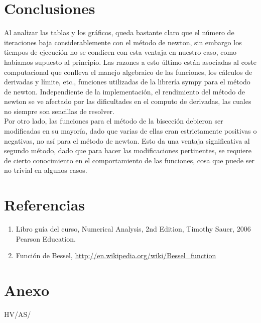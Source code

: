 \documentclass[spanish, fleqn]{article}
\begin{document}
\section{Conclusiones}
	Al analizar las tablas y los gráficos, queda bastante claro que el número 
	de iteraciones baja considerablemente con el método de newton, sin embargo
	los tiempos de ejecución no se condicen con esta ventaja en nuestro caso,
	como habíamos supuesto al principio. Las razones a esto último están
	asociadas al coste computacional que conlleva el manejo algebraico de las
	funciones, los cálculos de derivadas y límite, etc., funciones utilizadas
	de la librería sympy para el método de newton. Independiente de la 
	implementación, el rendimiento del método de newton se ve afectado por las
	dificultades en el computo de derivadas, las cuales no siempre son
	sencillas de resolver.\\
	Por otro lado, las funciones para el método de la bisección debieron ser
	modificadas en su mayoría, dado que varias de ellas eran estrictamente
	positivas o negativas, no así para el método de newton. Esto da una ventaja
	significativa al segundo método, dado que para hacer las modificaciones
	pertinentes, se requiere de cierto conocimiento en el comportamiento de las
	funciones, cosa que puede ser no trivial en algunos casos.   

\section{Referencias}
\begin{enumerate}
	\item
		Libro guía del curso, Numerical Analysis, 2nd Edition, Timothy Sauer,
		2006 Pearson Education.
	\item
		Función de Bessel, \url{http://en.wikipedia.org/wiki/Bessel_function}
\end{enumerate}

\newpage
\section{Anexo}


	

\vfill\hfill HV/AS/\LaTeXe
\end{document}
